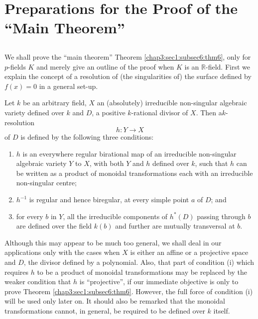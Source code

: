 \section{Preparations for the Proof of the ``Main
  Theorem''}\label{chap3:sec2} %

\subsection{}\label{chap3:sec2:subsec1} %

We shall prove the ``main theorem'' \ie Theorem \ref{chap3:sec1:subsec6:thm6}, only for
$p$-fields $K$ and merely give an outline of the proof when $K$ is an
$\mathbb{R}$-field. First we explain the concept of a resolution of
(the singularities of) the surface defined by $f(x)=0$ in a general
set-up.

Let $k$ be an arbitrary field, $X$ an (absolutely) irreducible
non-singular algebraic variety defined over $k$ and $D$, a positive
$k$-rational divisor of $X$. Then a\pageoriginale $k$-resolution
$$
h:Y\to X
$$
of $D$ is defined by the following three conditions:
\begin{enumerate}
\renewcommand{\theenumi}{\roman{enumi}}
\renewcommand{\labelenumi}{(\theenumi)}
\item $h$ is an everywhere regular birational map of an irreducible
  non-singular algebraic variety $Y$ to $X$, with both $Y$ and $h$
  defined over $k$, such that $h$ can be written as a product of
  monoidal transformations each with an irreducible non-singular
  centre;

\item $h^{-1}$ is regular and hence biregular, at every simple point
  $a$ of $D$; and 

\item for every $b$ in $Y$, all the irreducible components of
  $h^{\ast}(D)$ passing through $b$ are defined over the field $k(b)$
  and further are mutually transversal at $b$.
\end{enumerate}

Although this may appear to be much too general, we shall deal in our
applications only with the cases when $X$ is either an affine or a
projective space and $D$, the divisor defined by a polynomial. Also,
that part of condition (i) which requires $h$ to be a product of
monoidal transformations may be replaced by the weaker condition that
$h$ is ``projective'', if our immediate objective is only to prove
Theorem \ref{chap3:sec1:subsec6:thm6}. However, the full force of condition (i) will be
used only later on. It should also be remarked that the monoidal
transformations cannot, in general, be required to be defined over $k$
itself.

